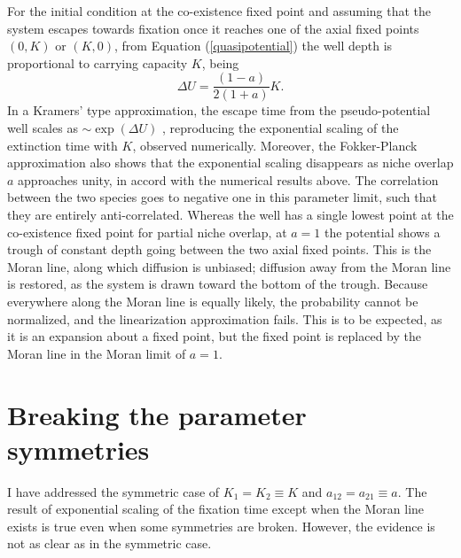 For the initial condition at the co-existence fixed point and assuming that the system escapes towards fixation once it reaches one of the axial fixed points $(0,K)$ or $(K,0)$, from Equation (\ref{quasipotential}) the well depth is proportional to carrying capacity $K$, being
\begin{equation}
\Delta U = \frac{(1-a)}{2(1+a)}K.
\end{equation}
In a Kramers' type approximation, the escape time from the pseudo-potential well scales as $\sim \exp(\Delta U)$ \cite{Hanggi1990}, reproducing the exponential scaling of the extinction time with $K$, observed numerically.  Moreover, the Fokker-Planck approximation also shows that the exponential scaling disappears as niche overlap $a$ approaches unity, in accord with the numerical results above. 
The correlation between the two species goes to negative one in this parameter limit, such that they are entirely anti-correlated. 
Whereas the well has a single lowest point at the co-existence fixed point for partial niche overlap, at $a=1$ the potential shows a trough of constant depth going between the two axial fixed points. 
This is the Moran line, along which diffusion is unbiased; diffusion away from the Moran line is restored, as the system is drawn toward the bottom of the trough. 
Because everywhere along the Moran line is equally likely, the probability cannot be normalized, and the linearization approximation fails. This is to be expected, as it is an expansion about a fixed point, but the fixed point is replaced by the Moran line in the Moran limit of $a=1$. 


\section{Breaking the parameter symmetries}
I have addressed the symmetric case of $K_1 = K_2 \equiv K$ and $a_{12} = a_{21} \equiv a$. 
The result of exponential scaling of the fixation time except when the Moran line exists is true even when some symmetries are broken. 
However, the evidence is not as clear as in the symmetric case. 

